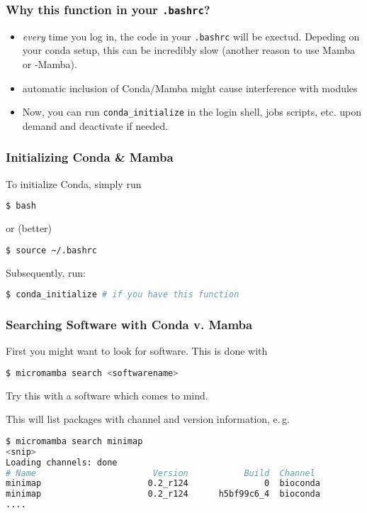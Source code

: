 \begin{frame}[fragile]
  \frametitle{Why this function in your \texttt{.bashrc}?}
  \begin{docs}
  	\begin{itemize}[<+->]
  		\item \emph{every} time you log in, the code in your \texttt{.bashrc} will be exectud. Depeding on your conda setup, this can be incredibly slow (another reason to use Mamba or \textmu-Mamba).
  		\item automatic inclusion of Conda/Mamba might cause interference with modules
  		\item Now, you can run \verb+conda_initialize+ in the login shell, jobs scripts, etc. upon demand and deactivate if needed.
  	\end{itemize}
  \end{docs}
\end{frame}

\begin{frame}[fragile]
  \frametitle{Initializing Conda \& Mamba}
  To initialize Conda, simply run
  \begin{lstlisting}[language=Bash, style=Shell]
$ bash
  \end{lstlisting}
  or (better)
  \begin{lstlisting}[language=Bash, style=Shell]
$ source ~/.bashrc
  \end{lstlisting}
  Subsequently, run: 
  \begin{lstlisting}[language=Bash, style=Shell]
$ conda_initialize # if you have this function
  \end{lstlisting}
\end{frame}



\begin{frame}[fragile]
  \frametitle{Searching Software with Conda v. Mamba}
  First you might want to look for software. This is done with
  \begin{lstlisting}[language=Bash, style=Shell]
$ micromamba search <softwarename>
  \end{lstlisting}
  \pause
  \begin{task}
  	Try this with a software which comes to mind.
  \end{task}
  \pause
  This will list packages with channel and version information, e.\,g.
  \begin{lstlisting}[language=Bash, style=Shell, basicstyle=\tiny]
$ micromamba search minimap
<snip>
Loading channels: done
# Name                       Version           Build  Channel             
minimap                     0.2_r124               0  bioconda            
minimap                     0.2_r124      h5bf99c6_4  bioconda
....
  \end{lstlisting}
\end{frame}


